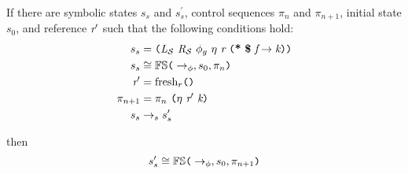 \begin{lemma}
\label{lem:access}
If there are symbolic states $s_s$ and $s_s^\prime$, control sequences $\pi_n$ and $\pi_{n+1}$, initial state $s_0$, and reference $\emph{r}^\prime$ such that the following conditions hold:
\begin{align}
s_s &= \lp \cfgnt{L}_{\mathcal{S}}\ \cfgnt{R}_{\mathcal{S}}\ \phi_g\ \eta\ \cfgnt{r}\ \lp \cfgt{*}\ \cfgt{\$}\ \cfgnt{f} \rightarrow \cfgnt{k}\rp \rp \\
s_s &\cong \mathbb{FS}\lp \rightarrow_{\phi},s_0,\pi_n\rp \\
\cfgnt{r}^\prime &= \mathrm{fresh}_r\lp \rp \\
\pi_{n+1} &=\pi_n\ \lp \eta\ \cfgnt{r}^\prime\ \cfgnt{k} \rp \\
s_s &\rightarrow_s s_s^\prime
\end{align}

then 
$$s_s^\prime \cong \mathbb{FS}\texttt{(} \rightarrow_{\phi},s_0,\pi_{n+1} \texttt{)}$$
\end{lemma}

